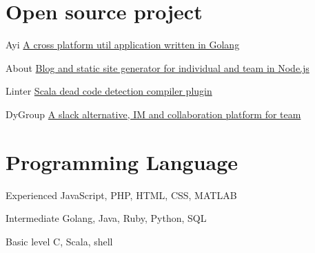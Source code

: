 \documentclass[fontsize=10pt]{tccv}
\begin{document}
\section{Open source project}

\begin{factlist}

\item{Ayi}
     {\href{https://github.com/dyweb/Ayi}{A cross platform util application written in Golang}}

\item{About}
    {\href{https://github.com/tongquhq/about}{Blog and static site generator for individual and team in Node.js}}

\item{Linter}
    {\href{https://github.com/at15/scala-linter}{Scala dead code detection compiler plugin}}

\item{DyGroup}
    {\href{https://coding.net/u/arrowrowe/p/dyGroup/git}{A slack alternative, IM and collaboration platform for team}}

\end{factlist}




%

\section{Programming Language}

\begin{factlist}

\item{Experienced}
     {JavaScript, PHP, HTML, CSS, MATLAB}

\item{Intermediate}
     {Golang, Java, Ruby, Python, SQL}

\item{Basic level}
     {C, Scala, shell}

\end{factlist}
\end{document}
